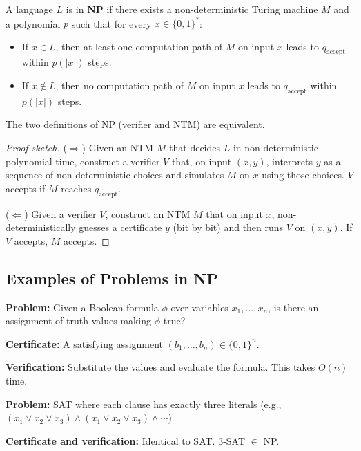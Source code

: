 \begin{definition}
A language $L$ is in \textbf{NP} if there exists a non-deterministic Turing machine $M$ and a polynomial $p$ such that for every $x \in \{0,1\}^*$:
\begin{itemize}
  \item If $x \in L$, then at least one computation path of $M$ on input $x$ leads to $q_{\text{accept}}$ within $p(|x|)$ steps.
  \item If $x \notin L$, then no computation path of $M$ on input $x$ leads to $q_{\text{accept}}$ within $p(|x|)$ steps.
\end{itemize}
\end{definition}

\begin{proposition}
The two definitions of NP (verifier and NTM) are equivalent.
\end{proposition}

\begin{proof}[Proof sketch]
($\Rightarrow$) Given an NTM $M$ that decides $L$ in non-deterministic polynomial time, construct a verifier $V$ that, on input $(x, y)$, interprets $y$ as a sequence of non-deterministic choices and simulates $M$ on $x$ using those choices. $V$ accepts if $M$ reaches $q_{\text{accept}}$.

($\Leftarrow$) Given a verifier $V$, construct an NTM $M$ that on input $x$, non-deterministically guesses a certificate $y$ (bit by bit) and then runs $V$ on $(x, y)$. If $V$ accepts, $M$ accepts.
\end{proof}

\subsection{Examples of Problems in NP}

\begin{example}
\textbf{Problem:} Given a Boolean formula $\phi$ over variables $x_1, \ldots, x_n$, is there an assignment of truth values making $\phi$ true?
\par\textbf{Certificate:} A satisfying assignment $(b_1, \ldots, b_n) \in \{0,1\}^n$.
\par\textbf{Verification:} Substitute the values and evaluate the formula. This takes $O(n)$ time.
\end{example}

\begin{example}[3-SAT]
\textbf{Problem:} SAT where each clause has exactly three literals (e.g., $(x_1 \lor \bar{x}_2 \lor x_3) \land (\bar{x}_1 \lor x_2 \lor x_3) \land \cdots$).
\par\textbf{Certificate and verification:} Identical to SAT. 3-SAT $\in$ NP.
\end{example}

